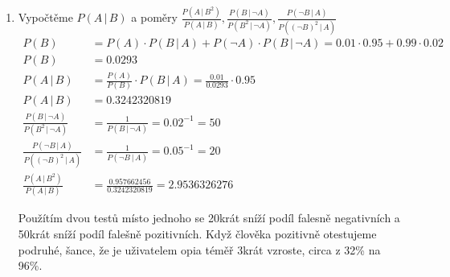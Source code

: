 \documentclass[12pt]{article}
\begin{document}
\begin{enumerate}
\begin{enumerate}
      \item Vypočtěme $P(A \,|\, B)$ a poměry $\frac{P(A \,|\, B^2)}{P(A \,|\, B)}, \frac{P(B \,|\, \neg A)}{P(B^2 \,|\, \neg A)}, \frac{P(\neg B \,|\, A)}{P((\neg B)^2 \,|\, A)}$
        \begin{align*}
          P(B) &= P(A) \cdot P(B \,|\, A) + P(\neg A) \cdot P(B \,|\, \neg A) = 0.01\cdot0.95 + 0.99\cdot 0.02 \\
          P(B) &= 0.0293 \\
          P(A \,|\, B) &= \frac{P(A)}{P(B)} \cdot P(B \,|\, A) = \frac{0.01}{0.0293} \cdot 0.95 \\
          P(A \,|\, B) &= 0.3242320819 \\
          \frac{P(B \,|\, \neg A)}{P(B^2 \,|\, \neg A)} &= \frac{1}{P(B \,|\, \neg A)} = 0.02^{-1} = 50 \\
          \frac{P(\neg B \,|\, A)}{P((\neg B)^2 \,|\, A)} &= \frac{1}{P(\neg B \,|\, A)} = 0.05^{-1} = 20 \\
          \frac{P(A \,|\, B^2)}{P(A \,|\, B)} &= \frac{0.957662456}{0.3242320819} = 2.9536326276
        \end{align*}
      
      Použítím dvou testů místo jednoho se 20krát sníží podíl falesně negativních
      a 50krát sníží podíl falešně pozitivních. Když člověka pozitivně otestujeme
      podruhé, šance, že je uživatelem opia téměř 3krát vzroste, circa z 32\% na 96\%.
    \end{enumerate}

  \end{enumerate}
\end{document}
